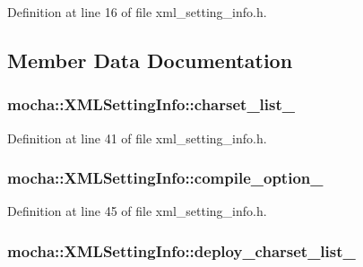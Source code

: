 Definition at line 16 of file xml\_\-setting\_\-info.h.



\subsection{Member Data Documentation}
\hypertarget{classmocha_1_1_x_m_l_setting_info_a5ec79a158bbd05223b47a65a360f9677}{
\subsubsection[{charset\_\-list\_\-}]{ {\bf mocha::XMLSettingInfo::charset\_\-list\_\-}}}
\label{classmocha_1_1_x_m_l_setting_info_a5ec79a158bbd05223b47a65a360f9677}


Definition at line 41 of file xml\_\-setting\_\-info.h.

\hypertarget{classmocha_1_1_x_m_l_setting_info_a3adc9b8aedbdf5a80a54b5737d7b4cf9}{
\subsubsection[{compile\_\-option\_\-}]{ {\bf mocha::XMLSettingInfo::compile\_\-option\_\-}}}
\label{classmocha_1_1_x_m_l_setting_info_a3adc9b8aedbdf5a80a54b5737d7b4cf9}


Definition at line 45 of file xml\_\-setting\_\-info.h.

\hypertarget{classmocha_1_1_x_m_l_setting_info_ae6cf2379ceb2ff0e305cf591ce53f398}{
\subsubsection[{deploy\_\-charset\_\-list\_\-}]{ {\bf mocha::XMLSettingInfo::deploy\_\-charset\_\-list\_\-}}}
\label{classmocha_1_1_x_m_l_setting_info_ae6cf2379ceb2ff0e305cf591ce53f398}


